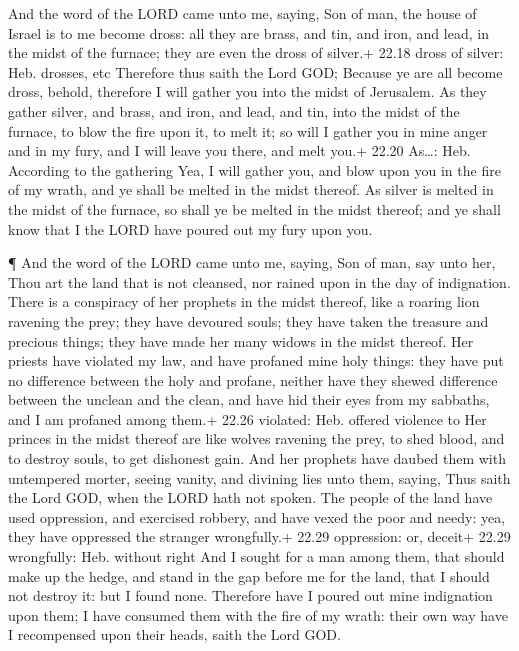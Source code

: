  And the word of the LORD came unto me, saying,
 Son of man, the house of Israel is to me become dross: all
they are brass, and tin, and iron, and lead, in the midst of the
furnace; they are even the dross of silver.+ 22.18 dross of silver: Heb.
drosses, etc  Therefore thus saith the Lord GOD; Because ye
are all become dross, behold, therefore I will gather you into the midst
of Jerusalem.  As they gather silver, and brass, and iron,
and lead, and tin, into the midst of the furnace, to blow the fire upon
it, to melt it; so will I gather you in mine anger and in my fury, and I
will leave you there, and melt you.+ 22.20 As\ldots: Heb. According to
the gathering  Yea, I will gather you, and blow upon you in
the fire of my wrath, and ye shall be melted in the midst thereof.
 As silver is melted in the midst of the furnace, so shall
ye be melted in the midst thereof; and ye shall know that I the LORD
have poured out my fury upon you.

 ¶ And the word of the LORD came unto me, saying,
 Son of man, say unto her, Thou art the land that is not
cleansed, nor rained upon in the day of indignation.  There
is a conspiracy of her prophets in the midst thereof, like a roaring
lion ravening the prey; they have devoured souls; they have taken the
treasure and precious things; they have made her many widows in the
midst thereof.  Her priests have violated my law, and have
profaned mine holy things: they have put no difference between the holy
and profane, neither have they shewed difference between the unclean and
the clean, and have hid their eyes from my sabbaths, and I am profaned
among them.+ 22.26 violated: Heb. offered violence to  Her
princes in the midst thereof are like wolves ravening the prey, to shed
blood, and to destroy souls, to get dishonest gain.  And
her prophets have daubed them with untempered morter, seeing vanity, and
divining lies unto them, saying, Thus saith the Lord GOD, when the LORD
hath not spoken.  The people of the land have used
oppression, and exercised robbery, and have vexed the poor and needy:
yea, they have oppressed the stranger wrongfully.+ 22.29 oppression: or,
deceit+ 22.29 wrongfully: Heb. without right  And I sought
for a man among them, that should make up the hedge, and stand in the
gap before me for the land, that I should not destroy it: but I found
none.  Therefore have I poured out mine indignation upon
them; I have consumed them with the fire of my wrath: their own way have
I recompensed upon their heads, saith the Lord GOD.

